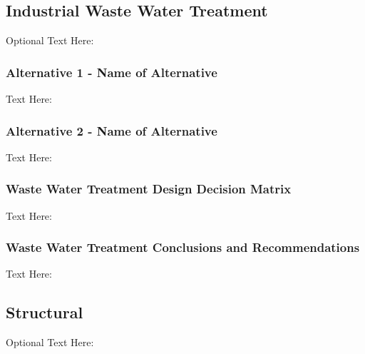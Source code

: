 \documentclass{ceri}
\begin{document}
\subsection{Industrial Waste Water Treatment}
Optional Text Here:

\subsubsection{Alternative 1 - Name of Alternative}
Text Here:

\subsubsection{Alternative 2 - Name of Alternative}
Text Here:

\subsubsection{Waste Water Treatment Design Decision Matrix}
Text Here:

\begin{table}[H]
\centering
\caption{Waste Water Treatment Design Decision Matrix}
\label{my-label}
\end{table}

\subsubsection{Waste Water Treatment Conclusions and Recommendations}
Text Here:

\subsection{Structural}
Optional Text Here:
\end{document}
